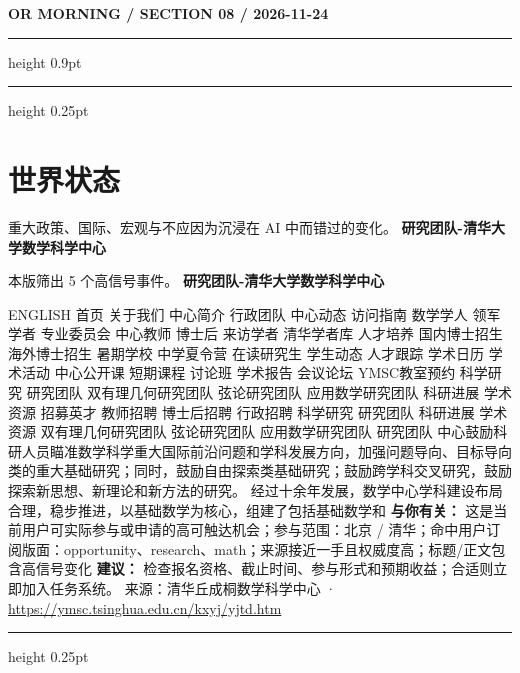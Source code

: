 \documentclass[10.5pt]{ctexart}
\begin{document}
\newpage
{\small\bfseries OR MORNING / SECTION 08 / 2026-11-24}
\vspace{2mm}
\hrule height 0.9pt
\vspace{1.5mm}
\hrule height 0.25pt
\vspace{4mm}
\section*{世界状态}
{\color{ormuted} 重大政策、国际、宏观与不应因为沉浸在 AI 中而错过的变化。}
\vspace{2mm}
{\LARGE\bfseries 研究团队-清华大学数学科学中心}\par
\vspace{1mm}
{\color{ormuted} 本版筛出 5 个高信号事件。}
\vspace{3mm}
{\Large\bfseries 研究团队-清华大学数学科学中心}\par
ENGLISH 首页 关于我们 中心简介 行政团队 中心动态 访问指南 数学学人 领军学者 专业委员会 中心教师 博士后 来访学者 清华学者库 人才培养 国内博士招生 海外博士招生 暑期学校 中学夏令营 在读研究生 学生动态 人才跟踪 学术日历 学术活动 中心公开课 短期课程 讨论班 学术报告 会议论坛 YMSC教室预约 科学研究 研究团队 双有理几何研究团队 弦论研究团队 应用数学研究团队 科研进展 学术资源 招募英才 教师招聘 博士后招聘 行政招聘 科学研究 研究团队 科研进展 学术资源 双有理几何研究团队 弦论研究团队 应用数学研究团队 研究团队 中心鼓励科研人员瞄准数学科学重大国际前沿问题和学科发展方向，加强问题导向、目标导向类的重大基础研究；同时，鼓励自由探索类基础研究；鼓励跨学科交叉研究，鼓励探索新思想、新理论和新方法的研究。 经过十余年发展，数学中心学科建设布局合理，稳步推进，以基础数学为核心，组建了包括基础数学和
\textbf{与你有关：} 这是当前用户可实际参与或申请的高可触达机会；参与范围：北京 / 清华；命中用户订阅版面：opportunity、research、math；来源接近一手且权威度高；标题/正文包含高信号变化
\textbf{建议：} 检查报名资格、截止时间、参与形式和预期收益；合适则立即加入任务系统。
{\footnotesize\color{ormuted} 来源：清华丘成桐数学科学中心 · \url{https://ymsc.tsinghua.edu.cn/kxyj/yjtd.htm}}
\vspace{4mm}
\hrule height 0.25pt
\vspace{3mm}
\end{document}

